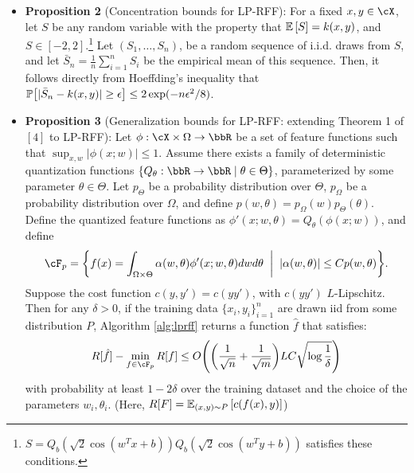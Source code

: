 \documentclass[12pt]{article}
\newcommand{\bS}{\bar{S}}
\newcommand{\sq}{\sqrt{2}}
\newcommand{\eps}{\epsilon}
\newcommand{\tsigma}{\tilde{\sigma}}
\begin{document}
\begin{itemize}
	
	\item \textbf{Proposition 2} (Concentration bounds for LP-RFF): For a fixed $x,y\in\cX$, let $S$ be any random variable with the property that $\expect{}{S} = k(x,y)$, and $S \in [-2,2]$.\footnote{$S=Q_b(\sq\cos(w^Tx+b))Q_b(\sq\cos(w^Ty+b))$ satisfies these conditions.}  Let $(S_1,\ldots,S_n)$, be a random sequence of i.i.d. draws from $S$, and let $\bS_n = \frac{1}{n}\sum_{i=1}^n S_i$ be the empirical mean of this sequence.  Then, it follows directly from Hoeffding's inequality that $\Prob{\big[|\bS_n - k(x,y)| \geq \epsilon\big]} \leq 2\exp(-n\eps^2/8)$.
	\item \textbf{Proposition 3} (Generalization bounds for LP-RFF: extending Theorem 1 of $[4]$ to LP-RFF):
	Let $\phi:\cX\times\Omega\rightarrow\RR$ be a set of feature functions such that $\sup_{x,w}|\phi(x;w)| \leq 1$. Assume there exists a family of deterministic quantization functions $\{Q_{\theta}:\RR\rightarrow\RR \;|\; \theta\in\Theta \}$, parameterized by some parameter $\theta\in\Theta$.  Let $p_{\Theta}$ be a probability distribution over $\Theta$, $p_{\Omega}$ be a probability distribution over $\Omega$, and define $p(w,\theta) = p_{\Omega}(w)p_{\Theta}(\theta)$.
	Define the quantized feature functions as $\phi'(x;w,\theta) = Q_{\theta}(\phi(x;w))$, and define
	$$\cF_p = \bigg\{f(x) = \int_{\Omega\times\Theta} \alpha(w,\theta) \phi'(x;w,\theta)dwd\theta \;\;\bigg|\;\; |\alpha(w,\theta)| \leq Cp(w,\theta)\bigg\}.$$
	Suppose the cost function $c(y,y') = c(yy')$, with $c(yy')$ $L$-Lipschitz.  Then for any $\delta > 0$, if the training data $\{x_i,y_i\}_{i=1}^n$ are drawn iid from some distribution $P$, Algorithm \ref{alg:lprff}  returns a function $\hat{f}$ that satisfies:
	$$R[\hat{f}] - \min_{f\in\cF_p}R[f] \leq O\Bigg(\bigg(\frac{1}{\sqrt{n}} + \frac{1}{\sqrt{m}}\bigg)LC \sqrt{\log\frac{1}{\delta}}\Bigg)$$
	with probability at least $1-2\delta$ over the training dataset and the choice of the parameters $w_i,\theta_i$.
	(Here, $R[F] = \expect{(x,y)\sim P}{c(f(x),y)}$)
\end{itemize}
\end{document}
